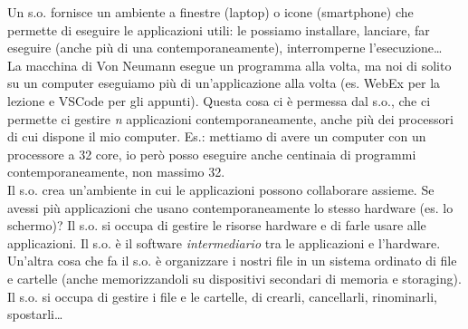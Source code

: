 Un s.o. fornisce un ambiente a finestre (laptop) o icone (smartphone) che permette di eseguire le applicazioni utili: le possiamo installare, lanciare, far eseguire (anche più di una contemporaneamente), interromperne l'esecuzione\dots\\
La macchina di Von Neumann esegue un programma alla volta, ma noi di solito su un computer eseguiamo più di un'applicazione alla volta (es. WebEx per la lezione e VSCode per gli appunti). Questa cosa ci è permessa dal s.o., che ci permette ci gestire \textit{n} applicazioni contemporaneamente, anche più dei processori di cui dispone il mio computer. Es.: mettiamo di avere un computer con un processore a 32 core, io però posso eseguire anche centinaia di programmi contemporaneamente, non massimo 32.\\
Il s.o. crea un'ambiente in cui le applicazioni possono collaborare assieme. Se avessi più applicazioni che usano contemporaneamente lo stesso hardware (es. lo schermo)? Il s.o. si occupa di gestire le risorse hardware e di farle usare alle applicazioni. Il s.o. è il software \textit{intermediario} tra le applicazioni e l'hardware.\\
Un'altra cosa che fa il s.o. è organizzare i nostri file in un sistema ordinato di file e cartelle (anche memorizzandoli su dispositivi secondari di memoria e storaging). Il s.o. si occupa di gestire i file e le cartelle, di crearli, cancellarli, rinominarli, spostarli\dots 

